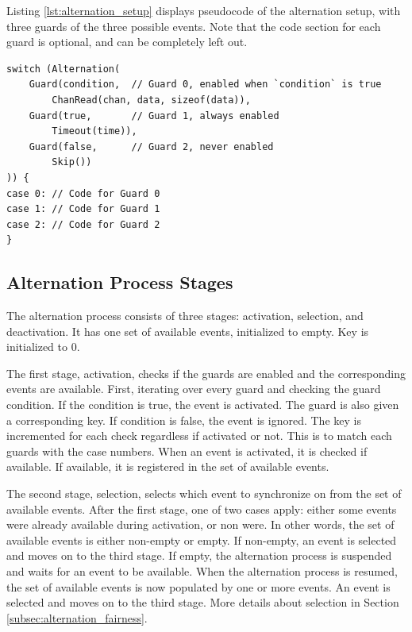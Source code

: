 Listing \ref{lst:alternation_setup} displays pseudocode of the alternation setup, with three guards of the three possible events. Note that the code section for each guard is optional, and can be completely left out.

\begin{lstlisting}[style=CustomC,caption={Pseudocode of alternation setup},label={lst:alternation_setup}]
switch (Alternation(
	Guard(condition,  // Guard 0, enabled when `condition` is true
		ChanRead(chan, data, sizeof(data)),
	Guard(true,       // Guard 1, always enabled
		Timeout(time)),
	Guard(false,      // Guard 2, never enabled
		Skip())
)) {
case 0: // Code for Guard 0
case 1: // Code for Guard 1
case 2: // Code for Guard 2
}
\end{lstlisting}

\subsection{Alternation Process Stages}

The alternation process consists of three stages: activation, selection, and deactivation. It has one set of available events, initialized to empty. Key is initialized to 0.

The first stage, activation, checks if the guards are enabled and the corresponding events are available. First, iterating over every guard and checking the guard condition. If the condition is true, the event is activated. The guard is also given a corresponding key. If condition is false, the event is ignored. The key is incremented for each check regardless if activated or not. This is to match each guards with the case numbers. When an event is activated, it is checked if available. If available, it is registered in the set of available events.

The second stage, selection, selects which event to synchronize on from the set of available events. After the first stage, one of two cases apply: either some events were already available during activation, or non were. In other words, the set of available events is either non\hyp{}empty or empty. If non\hyp{}empty, an event is selected and moves on to the third stage. If empty, the alternation process is suspended and waits for an event to be available. When the alternation process is resumed, the set of available events is now populated by one or more events. An event is selected and moves on to the third stage. More details about selection in Section \ref{subsec:alternation_fairness}.


